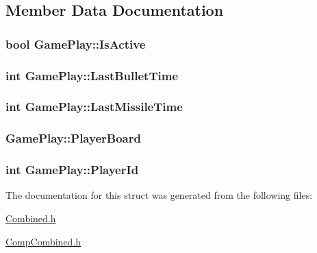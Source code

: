 \subsection{Member Data Documentation}
\hypertarget{structGamePlay_af408f47ae31ed92aedd293a42ab0e098}{
\subsubsection[{Is\-Active}]{\setlength{\rightskip}{0pt plus 5cm}bool Game\-Play\-::\-Is\-Active}}\label{structGamePlay_af408f47ae31ed92aedd293a42ab0e098}
\hypertarget{structGamePlay_a3953c8c4a1da0dd46a3ef927e31f6632}{
\subsubsection[{Last\-Bullet\-Time}]{\setlength{\rightskip}{0pt plus 5cm}int Game\-Play\-::\-Last\-Bullet\-Time}}\label{structGamePlay_a3953c8c4a1da0dd46a3ef927e31f6632}
\hypertarget{structGamePlay_ae141282049dcb7b13d1186472cfd4e88}{
\subsubsection[{Last\-Missile\-Time}]{\setlength{\rightskip}{0pt plus 5cm}int Game\-Play\-::\-Last\-Missile\-Time}}\label{structGamePlay_ae141282049dcb7b13d1186472cfd4e88}
\hypertarget{structGamePlay_a39c04914ca869ee339464e75b2477466}{
\subsubsection[{Player\-Board}]{ Game\-Play\-::\-Player\-Board}}\label{structGamePlay_a39c04914ca869ee339464e75b2477466}
\hypertarget{structGamePlay_acd6b4be0629dac15c7ea5154ce4ff392}{
\subsubsection[{Player\-Id}]{\setlength{\rightskip}{0pt plus 5cm}int Game\-Play\-::\-Player\-Id}}\label{structGamePlay_acd6b4be0629dac15c7ea5154ce4ff392}


The documentation for this struct was generated from the following files\-:\begin{DoxyCompactItemize}
\item 
\hyperlink{Combined_8h}{Combined.\-h}\item 
\hyperlink{CompCombined_8h}{Comp\-Combined.\-h}\end{DoxyCompactItemize}
